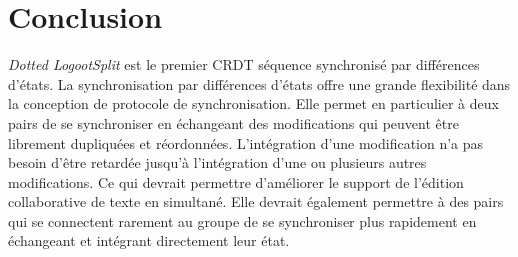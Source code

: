 \section{Conclusion}

\emph{Dotted LogootSplit} est le premier \ac{CRDT} séquence synchronisé par différences d'états.
La synchronisation par différences d'états offre une grande flexibilité dans la conception de protocole de synchronisation.
Elle permet en particulier à deux pairs de se synchroniser en échangeant des modifications qui peuvent être librement dupliquées et réordonnées.
L'intégration d'une modification n'a pas besoin d'être retardée jusqu'à l'intégration d'une ou plusieurs autres modifications.
Ce qui devrait permettre d'améliorer le support de l'édition collaborative de texte en simultané.
Elle devrait également permettre à des pairs qui se connectent rarement au groupe de se synchroniser plus rapidement en échangeant et intégrant directement leur état.
